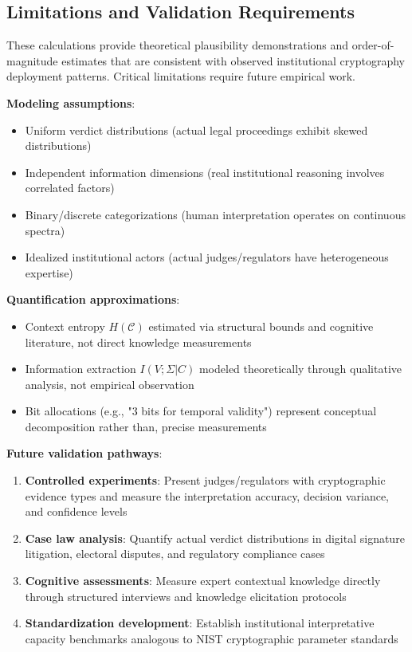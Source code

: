 \documentclass{ieeeaccess}
\begin{document}
\subsection{Limitations and Validation Requirements}\label{app:limitations}

These calculations provide theoretical plausibility demonstrations and order-of-magnitude estimates that are consistent with observed institutional cryptography deployment patterns. Critical limitations require future empirical work.

\textbf{Modeling assumptions}:
\begin{itemize}
\item Uniform verdict distributions (actual legal proceedings exhibit skewed distributions)
\item Independent information dimensions (real institutional reasoning involves correlated factors)
\item Binary/discrete categorizations (human interpretation operates on continuous spectra)
\item Idealized institutional actors (actual judges/regulators have heterogeneous expertise)
\end{itemize}

\textbf{Quantification approximations}:
\begin{itemize}
\item Context entropy $H(\mathcal{C})$ estimated via structural bounds and cognitive literature, not direct knowledge measurements
\item Information extraction $I(V;\Sigma|C)$ modeled theoretically through qualitative analysis, not empirical observation
\item Bit allocations (e.g., "3 bits for temporal validity") represent conceptual decomposition rather than, precise measurements
\end{itemize}

\textbf{Future validation pathways}:
\begin{enumerate}
\item \textbf{Controlled experiments}: Present judges/regulators with cryptographic evidence types and measure the interpretation accuracy, decision variance, and confidence levels
\item \textbf{Case law analysis}: Quantify actual verdict distributions in digital signature litigation, electoral disputes, and regulatory compliance cases
\item \textbf{Cognitive assessments}: Measure expert contextual knowledge directly through structured interviews and knowledge elicitation protocols
\item \textbf{Standardization development}: Establish institutional interpretative capacity benchmarks analogous to NIST cryptographic parameter standards
\end{enumerate}
\end{document}
